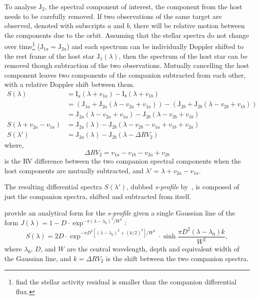 To analyse \(\textrm{J}_2\), the spectral component of interest, the component from the host needs to be carefully removed.
If two observations of the same target are observed, denoted with subscripts \(a\) and \(b\), there will be relative motion between the components due to the orbit.
Assuming that the stellar spectra do not change over time\footnote{\citep{kostogryz_spectral_2013} find the stellar activity residual is smaller than the companion differential flux.} (\(\textrm{J}_{1a} = \textrm{J}_{2a}\)) and each spectrum can be individually Doppler shifted to the rest frame of the host star \(\textrm{J}_{1}(\lambda)\), then the spectrum of the host star can be removed though subtraction of the two observations.
Mutually cancelling the host component leaves two components of the companion subtracted from each other, with a relative Doppler shift between them.
\begin{align}
S(\lambda) &= \textrm{I}_{a}(\lambda + v_{1a}) - \textrm{I}_{b}(\lambda + v_{1b}) \nonumber \\
&= (\textrm{J}_{1a} + \textrm{J}_{2a}(\lambda - v_{2a} + v_{1a})) - (\textrm{J}_{2b} +\textrm{J}_{2b}(\lambda - v_{2b} + v_{1b})) \nonumber \\
&= \textrm{J}_{2a}(\lambda - v_{2a} + v_{1a}) - \textrm{J}_{2b}(\lambda - v_{2b} + v_{1b}) \nonumber \\
S(\lambda + v_{2a}-v_{1a}) &= \textrm{J}_{2a}(\lambda) - \textrm{J}_{2b}(\lambda - v_{2b} - v_{1a} + v_{1b} + v_{2a})\\
S(\lambda') &= \textrm{J}_{2a}(\lambda) - \textrm{J}_{2b}(\lambda - \Delta {RV}_2) \label{eqn:sprofile}
\end{align}
where,
\begin{equation}
\Delta {RV}_2 = v_{1a} - v_{1b} - v_{2a} + v_{2b} \label{eqn:companion_difference}
\end{equation}
is the {RV} difference between the two companion spectral components when the host components are mutually subtracted,
and \(\lambda' = \lambda + v_{2a}-v_{1a}\).

The resulting differential spectra \(S({\lambda'})\), dubbed \emph{s-profile} by~\citet{ferluga_separating_1997}, is composed of just the companion spectra, shifted and subtracted from itself.

\citet{ferluga_separating_1997} provide an analytical form for the \emph{s-profile} given a single Gaussian line of the form
$J(\lambda) = 1- D \cdot\exp^{{-\pi {(\lambda - \lambda_0)}^2} / {{W}^{2}}}$:
\begin{equation}
S(\lambda) = 2 D\cdot\exp^{{-\pi {D}^{2} [{(\lambda - \lambda_0)}^{2} +{(k/2)}^{2}]}/{{W}^{2}}} \cdot \sinh{\frac{\pi {D}^{2}(\lambda-\lambda_0)k}{{W}^{2}}},\label{eqn:sprofile_gaussain}
\end{equation}
where $\lambda_0$, \(D\), and \(W\) are the central wavelength, depth and equivalent width of the Gaussian line, and $k=\Delta {RV}_2 $ is the shift between the two companion spectra.

